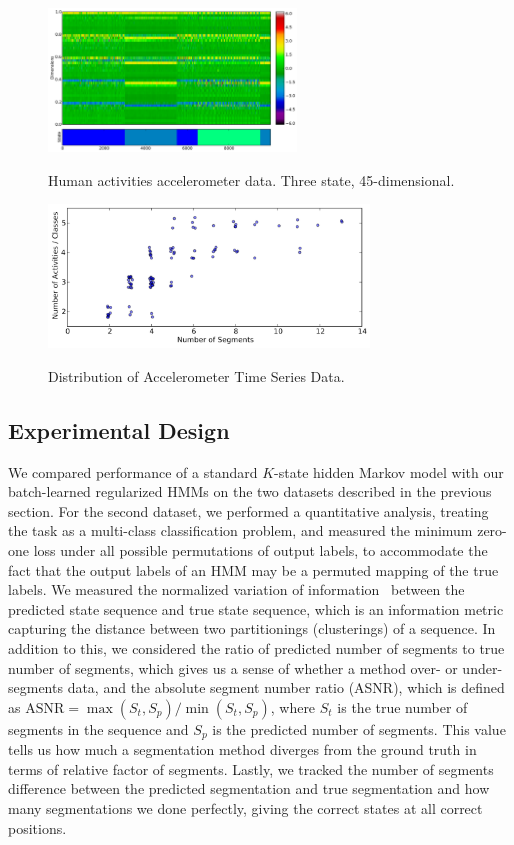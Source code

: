 \documentclass[letterpaper]{article}
\begin{document}
\begin{figure}[htbp]
  \centering
    \includegraphics[width=1.\linewidth, height
    = 1.5in]{images/accelerometer-data.pdf}
    \label{fig:accelerometer}
  \caption{\small{Human activities accelerometer data. Three state,
  45-dimensional.}}
\end{figure}

\begin{figure}[htbp]
  \centering
    \includegraphics[width=1.\linewidth,
    height = 1.5in]{images/distribution_of_dataset_segments.pdf}
    \label{fig:distribution}
    \caption{\small{Distribution of Accelerometer Time Series Data.}}
\end{figure}

\subsection{Experimental Design}

We compared performance of a standard $K$-state hidden Markov model with our
batch-learned regularized HMMs on the two datasets described in the previous
section. For the second dataset, we performed a quantitative analysis, treating
the task as a multi-class classification problem, and measured the minimum
zero-one loss under all possible permutations of output labels, to accommodate
the fact that the output labels of an HMM may be a permuted mapping of the true
labels. We measured the normalized variation of information~\cite{meila} between
the predicted state sequence and true state sequence, which is an information
metric capturing the distance between two
partitionings (clusterings) of a sequence. In addition to this, we considered
the ratio of predicted number of segments to true number of segments, which
gives us a sense of whether a method over- or under-segments data, and the
absolute segment number ratio (ASNR), which is defined as
$\text{ASNR} = \max(S_t, S_p)/\min(S_t, S_p)$, 
where $S_t$ is the true number of segments in the sequence and $S_p$ is the predicted number of segments. This value tells us how much a segmentation method diverges from the ground truth in terms of relative factor of segments. Lastly, we tracked the number of segments difference between the predicted segmentation and true segmentation and how many segmentations we done perfectly, giving the correct states at all correct positions.
\end{document}
